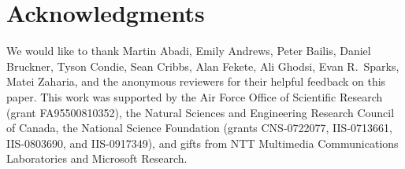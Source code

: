 \section*{Acknowledgments}
We would like to thank Martin Abadi, Emily Andrews, Peter Bailis, Daniel
Bruckner, Tyson Condie, Sean Cribbs, Alan Fekete, Ali Ghodsi, Evan R.\ Sparks,
Matei Zaharia, and the anonymous reviewers for their helpful feedback on this
paper.  This work was supported by the Air Force Office of Scientific Research
(grant FA95500810352), the Natural Sciences and Engineering Research Council of
Canada, the National Science Foundation (grants CNS-0722077, IIS-0713661,
IIS-0803690, and IIS-0917349), and gifts from NTT Multimedia Communications
Laboratories and Microsoft Research.
